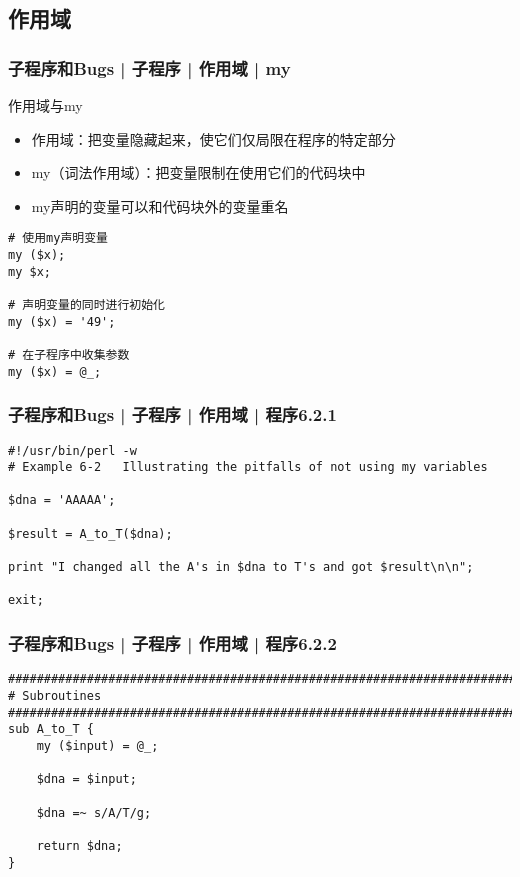 \subsection{作用域}
\begin{frame}[fragile]
  \frametitle{子程序和Bugs | 子程序 | 作用域 | \alert{my}}
  \begin{block}{作用域与my}
    \begin{itemize}
      \item 作用域：把变量隐藏起来，使它们仅局限在程序的特定部分
      \item my（词法作用域）：把变量限制在使用它们的代码块中
      \item my声明的变量可以和代码块外的变量重名
    \end{itemize}
  \end{block}
  \pause
\begin{lstlisting}
# 使用my声明变量
my ($x);
my $x;

# 声明变量的同时进行初始化
my ($x) = '49';

# 在子程序中收集参数
my ($x) = @_;
\end{lstlisting}
\end{frame}

\begin{frame}[fragile]
  \frametitle{子程序和Bugs | 子程序 | 作用域 | 程序6.2.1}
\begin{lstlisting}[firstnumber=1]
#!/usr/bin/perl -w
# Example 6-2   Illustrating the pitfalls of not using my variables

$dna = 'AAAAA';

$result = A_to_T($dna);

print "I changed all the A's in $dna to T's and got $result\n\n";

exit;
\end{lstlisting}
\end{frame}

\begin{frame}[fragile]
  \frametitle{子程序和Bugs | 子程序 | 作用域 | 程序6.2.2}
\begin{lstlisting}[firstnumber=12,basicstyle=\small\tt]
################################################################################
# Subroutines
################################################################################
sub A_to_T {
    my ($input) = @_;

    $dna = $input;

    $dna =~ s/A/T/g;

    return $dna;
}
\end{lstlisting}
\end{frame}

